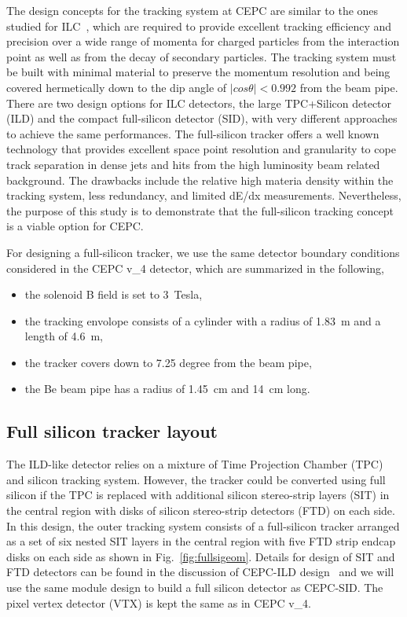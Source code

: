 The design concepts for the tracking system at CEPC are similar to the ones studied for ILC~\cite{Adolphsen:2013kya,Behnke:2013lya},
which are required to provide excellent tracking efficiency and precision over a wide range of momenta for charged particles from the 
interaction point as well as from the decay of secondary particles. The tracking system must be built with minimal
material to preserve the momentum resolution and being covered hermetically down to the dip angle of 
$|cos\theta|<0.992$ from the beam pipe. There are two design options for ILC detectors, the large TPC+Silicon detector (ILD) and 
the compact full-silicon detector (SID), with very different approaches to achieve the same performances. 
The full-silicon tracker offers a well known technology that provides excellent space point resolution and granularity to 
cope track separation in dense jets and hits from the high luminosity beam related background. The drawbacks include the 
relative high materia density within the tracking system, less redundancy, and limited dE/dx measurements. 
Nevertheless, the purpose of this study is to demonstrate that the full-silicon tracking concept is a viable option for CEPC.

For designing a full-silicon tracker, we use the same detector boundary conditions considered in the CEPC v\_4
detector, which are summarized in the following,
\begin{itemize}
 \item the solenoid B field is set to 3~Tesla,
 \item the tracking envolope consists of a cylinder with a radius of 1.83~m and a length of 4.6~m,
 \item the tracker covers down to 7.25 degree from the beam pipe,
 \item the Be beam pipe has a radius of 1.45~cm and 14~cm long.
\end{itemize}

\subsection{Full silicon tracker layout} 
The ILD-like detector relies on a mixture of Time Projection Chamber (TPC) and silicon tracking system. However, the 
tracker could be converted using full silicon if the TPC is replaced with additional silicon stereo-strip layers (SIT) 
in the central region with disks of silicon stereo-strip detectors (FTD) on each side. 
In this design, the outer tracking system consists of a full-silicon tracker arranged as a set of six nested SIT layers in the central 
region with five FTD strip endcap disks on each side as shown in Fig.~\ref{fig:fullsigeom}. Details for design of 
SIT and FTD detectors can be found in the discussion of CEPC-ILD design~\cite{cepcILD} and
 we will use the same module design to build a full silicon detector as CEPC-SID. The pixel vertex detector (VTX) is kept the same as 
in CEPC v\_4.  
     
